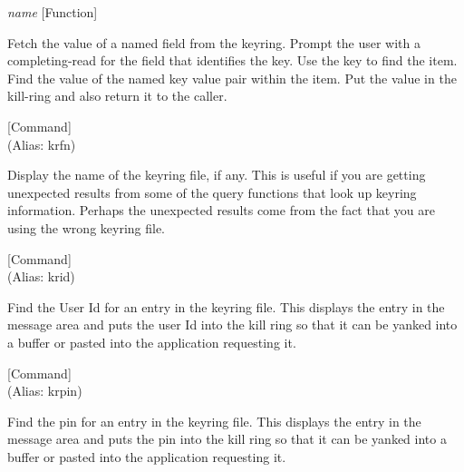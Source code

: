 \vspace{1em}
\noindent
{}
\usebox{\funcname}\emph{name}
 \hfill [Function]

\begin{doc-string}
Fetch the value of a named field from the keyring.  Prompt the user with a completing-read
for the field that identifies the key.  Use the key to find the item.  Find the value of the named
key value pair within the item.  Put the value in the kill-ring and also return it to the caller.
\end{doc-string}

\vspace{1em}
\noindent
{}
\usebox{\funcname}
 \hfill [Command]\\%
 (Alias: krfn)

\begin{doc-string}
Display the name of the keyring file, if any.  This is useful if you are
getting unexpected results from some of the query functions that look up keyring
information.  Perhaps the unexpected results come from the fact that you are
using the wrong keyring file.
\end{doc-string}

\vspace{1em}
\noindent
{}
\usebox{\funcname}
 \hfill [Command]\\%
 (Alias: krid)

\begin{doc-string}
Find the User Id for an entry in the keyring file.  This displays the entry
in the message area and puts the user Id into the kill ring so that it can be
yanked into a buffer or pasted into the application requesting it.
\end{doc-string}

\vspace{1em}
\noindent
{}
\usebox{\funcname}
 \hfill [Command]\\%
 (Alias: krpin)

\begin{doc-string}
Find the pin for an entry in the keyring file.  This displays the entry in
the message area and puts the pin into the kill ring so that it can be yanked
into a buffer or pasted into the application requesting it.
\end{doc-string}

